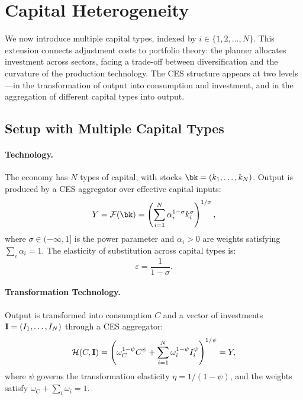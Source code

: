 \section{Capital Heterogeneity}
\label{sec:ac-heterogeneity}

We now introduce multiple capital types, indexed by $i \in \{1, 2, \ldots, N\}$. This extension connects adjustment costs to portfolio theory: the planner allocates investment across sectors, facing a trade-off between diversification and the curvature of the production technology. The CES structure appears at two levels---in the transformation of output into consumption and investment, and in the aggregation of different capital types into output.

\subsection{Setup with Multiple Capital Types}
\label{subsec:ac-het-setup}

\paragraph{Technology.}
The economy has $N$ types of capital, with stocks $\bk = (k_1, \ldots, k_N)$. Output is produced by a CES aggregator over effective capital inputs:
\begin{equation}
Y = \F(\bk) = \left( \sum_{i=1}^{N} \alpha_i^{1-\sigma} k_i^{\sigma} \right)^{1/\sigma},
\label{eq:ac-het-production}
\end{equation}
where $\sigma \in (-\infty, 1]$ is the power parameter and $\alpha_i > 0$ are weights satisfying $\sum_i \alpha_i = 1$. The elasticity of substitution across capital types is:
\begin{equation}
\varepsilon = \frac{1}{1 - \sigma}.
\label{eq:ac-het-epsilon}
\end{equation}

\paragraph{Transformation Technology.}
Output is transformed into consumption $C$ and a vector of investments $\mathbf{I} = (I_1, \ldots, I_N)$ through a CES aggregator:
\begin{equation}
\mathcal{H}(C, \mathbf{I}) = \left( \omega_C^{1-\psi} C^{\psi} + \sum_{i=1}^{N} \omega_i^{1-\psi} I_i^{\psi} \right)^{1/\psi} = Y,
\label{eq:ac-het-transformation}
\end{equation}
where $\psi$ governs the transformation elasticity $\eta = 1/(1-\psi)$, and the weights satisfy $\omega_C + \sum_i \omega_i = 1$.

